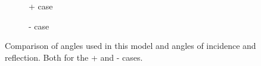 \documentclass[10pt,a4paper]{eitExjobb}
\begin{document}
	\begin{figure}[h]
		\centering
		\begin{subfigure}{0.45\textwidth}
			
			\caption{+ case}
		\end{subfigure}
		\begin{subfigure}{0.45\textwidth}
			
			\caption{- case}
		\end{subfigure}
		\caption{\label{fig:bragg-comparison} Comparison of angles used in this model and angles of incidence and reflection. Both for the + and - cases.}
	\end{figure}
	
	
\end{document}
